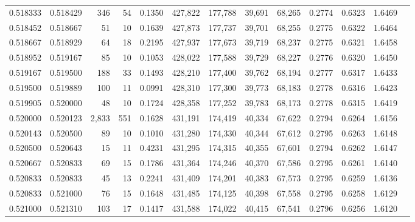 \begin{tabular}{rrrrrrrrrrrrr}
0.518333 & 0.518429 &   346 &  54 &                                     0.1350 & 427,822 & 177,788 &  39,691 &  68,265 & 0.2774 & 0.6323 & 1.6469 \\
0.518452 & 0.518667 &    51 &  10 &                                     0.1639 & 427,873 & 177,737 &  39,701 &  68,255 & 0.2775 & 0.6322 & 1.6464 \\
0.518667 & 0.518929 &    64 &  18 &                                     0.2195 & 427,937 & 177,673 &  39,719 &  68,237 & 0.2775 & 0.6321 & 1.6458 \\
0.518952 & 0.519167 &    85 &  10 &                                     0.1053 & 428,022 & 177,588 &  39,729 &  68,227 & 0.2776 & 0.6320 & 1.6450 \\
0.519167 & 0.519500 &   188 &  33 &                                     0.1493 & 428,210 & 177,400 &  39,762 &  68,194 & 0.2777 & 0.6317 & 1.6433 \\
0.519500 & 0.519889 &   100 &  11 &                                     0.0991 & 428,310 & 177,300 &  39,773 &  68,183 & 0.2778 & 0.6316 & 1.6423 \\
0.519905 & 0.520000 &    48 &  10 &                                     0.1724 & 428,358 & 177,252 &  39,783 &  68,173 & 0.2778 & 0.6315 & 1.6419 \\
0.520000 & 0.520123 & 2,833 & 551 &                                     0.1628 & 431,191 & 174,419 &  40,334 &  67,622 & 0.2794 & 0.6264 & 1.6156 \\
0.520143 & 0.520500 &    89 &  10 &                                     0.1010 & 431,280 & 174,330 &  40,344 &  67,612 & 0.2795 & 0.6263 & 1.6148 \\
0.520500 & 0.520643 &    15 &  11 &                                     0.4231 & 431,295 & 174,315 &  40,355 &  67,601 & 0.2794 & 0.6262 & 1.6147 \\
0.520667 & 0.520833 &    69 &  15 &                                     0.1786 & 431,364 & 174,246 &  40,370 &  67,586 & 0.2795 & 0.6261 & 1.6140 \\
0.520833 & 0.520833 &    45 &  13 &                                     0.2241 & 431,409 & 174,201 &  40,383 &  67,573 & 0.2795 & 0.6259 & 1.6136 \\
0.520833 & 0.521000 &    76 &  15 &                                     0.1648 & 431,485 & 174,125 &  40,398 &  67,558 & 0.2795 & 0.6258 & 1.6129 \\
0.521000 & 0.521310 &   103 &  17 &                                     0.1417 & 431,588 & 174,022 &  40,415 &  67,541 & 0.2796 & 0.6256 & 1.6120 \\

\end{tabular}
